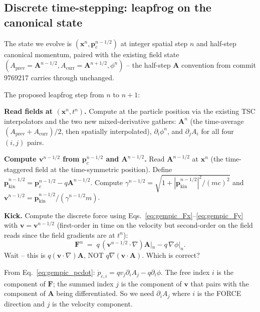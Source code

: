 \documentclass[11pt,a4paper]{article}
\newcommand{\vv}[1]{\mathbf{#1}}
\begin{document}
\subsection{Discrete time-stepping: leapfrog on the canonical state}

The state we evolve is $(\vv{x}^n, \vv{p}_c^{n-1/2})$ at integer
spatial step $n$ and half-step canonical momentum, paired with the
existing field state $(A_{\mathrm{prev}} = \vv{A}^{n-1/2},
A_{\mathrm{curr}} = \vv{A}^{n+1/2}, \phi^n)$ -- the half-step
$\vv{A}$ convention from commit 9769217 carries through unchanged.

The proposed leapfrog step from $n$ to $n+1$:

\begin{algsteps}
  \item \textbf{Read fields at $(\vv{x}^n, t^n)$.}
    Compute at the particle position via the existing TSC
    interpolators and the two new mixed-derivative gathers:
    $\vv{A}^n$ (the time-average $(A_{\mathrm{prev}} +
    A_{\mathrm{curr}})/2$, then spatially interpolated),
    $\partial_i \phi^n$, and $\partial_j A_i$ for all four
    $(i, j)$ pairs.
  \item \textbf{Compute $\vv{v}^{n-1/2}$ from $\vv{p}_c^{n-1/2}$
    and $\vv{A}^{n-1/2}$.}
    Read $\vv{A}^{n-1/2}$ at $\vv{x}^n$ (the time-staggered
    field at the time-symmetric position).
    Define $\vv{p}_{\mathrm{kin}}^{n-1/2} = \vv{p}_c^{n-1/2}
    - q\vv{A}^{n-1/2}$.
    Compute $\gamma^{n-1/2} = \sqrt{1 +
    |\vv{p}_{\mathrm{kin}}^{n-1/2}|^2/(m c)^2}$ and
    $\vv{v}^{n-1/2} = \vv{p}_{\mathrm{kin}}^{n-1/2}/(\gamma^{n-1/2} m)$.
  \item \textbf{Kick.}
    Compute the discrete force using Eqs.~\eqref{eq:gempic_Fx}--\eqref{eq:gempic_Fy}
    with $\vv{v} = \vv{v}^{n-1/2}$ (first-order in time on the
    velocity but second-order on the field reads since the
    field gradients are at $t^n$):
    \begin{equation}
    \vv{F}^n \;=\; q\,(\vv{v}^{n-1/2}\cdot\nabla)\vv{A}|_{n}
                - q\,\nabla\phi|_{n}.
    \end{equation}
    Wait -- this is $q (\vv{v}\cdot\nabla)\vv{A}$, NOT
    $q\nabla(\vv{v}\cdot\vv{A})$.  Which is correct?

    From Eq.~\eqref{eq:gempic_pcdot}:
    $\dot{p}_{c,i} = q v_j \partial_i A_j - q \partial_i \phi$.
    The free index $i$ is the component of $\vv{F}$; the summed
    index $j$ is the component of $\vv{v}$ that pairs with the
    component of $\vv{A}$ being differentiated.  So we need
    $\partial_i A_j$ where $i$ is the FORCE direction and $j$ is
    the velocity component.


\end{algsteps}
\end{document}
